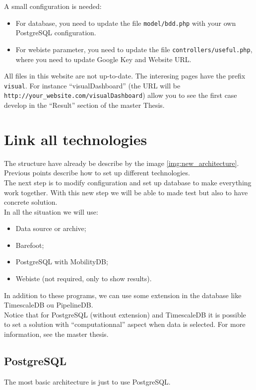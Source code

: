 \documentclass[a4paper,12pt]{article}
\begin{document}
        A small configuration is needed:
        \begin{itemize}
            \item For database, you need to update the file \verb|model/bdd.php| with your own PostgreSQL configuration.
            \item For webiste parameter, you need to update the file \verb|controllers/useful.php|, where you need to update Google Key and Website URL.
        \end{itemize}
        
        All files in this website are not up-to-date. The interesing pages have the prefix \verb|visual|. For instance ``visualDashboard'' (the URL will be \verb|http://your_website.com/visualDashboard|) allow you to see the first case develop in the ``Result'' section of the master Thesis.
        
         
\section{Link all technologies}
    \label{sec:link_technologies}
    The structure have already be describe by the image \ref{img:new_architecture}. Previous points describe how to set up different technologies.\\
    The next step is to modify configuration and set up database to make everything work together. With this new step we will be able to made test but also to have concrete solution.\\
    
    In all the situation we will use:
    \begin{itemize}
        \item Data source or archive;
        \item Barefoot;
        \item PostgreSQL with MobilityDB;
        \item Webiste (not required, only to show results).
    \end{itemize}
    In addition to these programs, we can use some extension in the database like TimescaleDB ou PipelineDB.\\
    
    Notice that for PostgreSQL (without extension) and TimescaleDB it is possible to set a solution with ``computationnal'' aspect when data is selected. For more information, see the master thesis.
    
    
    \subsection{PostgreSQL}
        The most basic architecture is just to use PostgreSQL.
        
        
        
    
\end{document}
